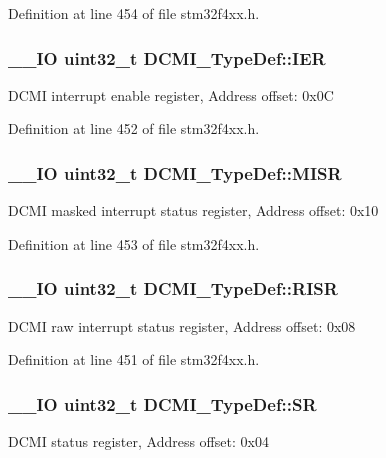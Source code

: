 Definition at line 454 of file stm32f4xx.\-h.

\hypertarget{struct_d_c_m_i___type_def_a91ce93b57d8382147574c678ee497c63}{
\subsubsection[{I\-E\-R}]{\setlength{\rightskip}{0pt plus 5cm}\-\_\-\-\_\-\-I\-O {\bf uint32\-\_\-t} D\-C\-M\-I\-\_\-\-Type\-Def\-::\-I\-E\-R}}\label{struct_d_c_m_i___type_def_a91ce93b57d8382147574c678ee497c63}
D\-C\-M\-I interrupt enable register, Address offset\-: 0x0\-C 

Definition at line 452 of file stm32f4xx.\-h.

\hypertarget{struct_d_c_m_i___type_def_ab367c4ca2e8ac87238692e6d55d622ec}{
\subsubsection[{M\-I\-S\-R}]{\setlength{\rightskip}{0pt plus 5cm}\-\_\-\-\_\-\-I\-O {\bf uint32\-\_\-t} D\-C\-M\-I\-\_\-\-Type\-Def\-::\-M\-I\-S\-R}}\label{struct_d_c_m_i___type_def_ab367c4ca2e8ac87238692e6d55d622ec}
D\-C\-M\-I masked interrupt status register, Address offset\-: 0x10 

Definition at line 453 of file stm32f4xx.\-h.

\hypertarget{struct_d_c_m_i___type_def_ae0aba9f38498cccbe0186b7813825026}{
\subsubsection[{R\-I\-S\-R}]{\setlength{\rightskip}{0pt plus 5cm}\-\_\-\-\_\-\-I\-O {\bf uint32\-\_\-t} D\-C\-M\-I\-\_\-\-Type\-Def\-::\-R\-I\-S\-R}}\label{struct_d_c_m_i___type_def_ae0aba9f38498cccbe0186b7813825026}
D\-C\-M\-I raw interrupt status register, Address offset\-: 0x08 

Definition at line 451 of file stm32f4xx.\-h.

\hypertarget{struct_d_c_m_i___type_def_a1bbe4b3cc5d9552526bec462b42164d5}{
\subsubsection[{S\-R}]{\setlength{\rightskip}{0pt plus 5cm}\-\_\-\-\_\-\-I\-O {\bf uint32\-\_\-t} D\-C\-M\-I\-\_\-\-Type\-Def\-::\-S\-R}}\label{struct_d_c_m_i___type_def_a1bbe4b3cc5d9552526bec462b42164d5}
D\-C\-M\-I status register, Address offset\-: 0x04 

